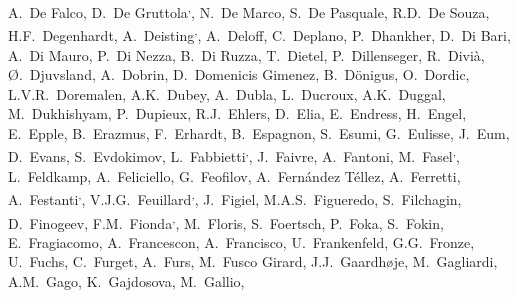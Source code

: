 \begin{flushleft}
A.~De Falco\And, 
D.~De Gruttola\textsuperscript{,}\And, 
N.~De Marco\And, 
S.~De Pasquale\And, 
R.D.~De Souza\And, 
H.F.~Degenhardt\And, 
A.~Deisting\textsuperscript{,}\And, 
A.~Deloff\And, 
C.~Deplano\And, 
P.~Dhankher\And, 
D.~Di Bari\And, 
A.~Di Mauro\And, 
P.~Di Nezza\And, 
B.~Di Ruzza\And, 
T.~Dietel\And, 
P.~Dillenseger\And, 
R.~Divi\`{a}\And, 
{\O}.~Djuvsland\And, 
A.~Dobrin\And, 
D.~Domenicis Gimenez\And, 
B.~D\"{o}nigus\And, 
O.~Dordic\And, 
L.V.R.~Doremalen\And, 
A.K.~Dubey\And, 
A.~Dubla\And, 
L.~Ducroux\And, 
A.K.~Duggal\And, 
M.~Dukhishyam\And, 
P.~Dupieux\And, 
R.J.~Ehlers\And, 
D.~Elia\And, 
E.~Endress\And, 
H.~Engel\And, 
E.~Epple\And, 
B.~Erazmus\And, 
F.~Erhardt\And, 
B.~Espagnon\And, 
S.~Esumi\And, 
G.~Eulisse\And, 
J.~Eum\And, 
D.~Evans\And, 
S.~Evdokimov\And, 
L.~Fabbietti\textsuperscript{,}\And, 
J.~Faivre\And, 
A.~Fantoni\And, 
M.~Fasel\textsuperscript{,}\And, 
L.~Feldkamp\And, 
A.~Feliciello\And, 
G.~Feofilov\And, 
A.~Fern\'{a}ndez T\'{e}llez\And, 
A.~Ferretti\And, 
A.~Festanti\textsuperscript{,}\And, 
V.J.G.~Feuillard\textsuperscript{,}\And, 
J.~Figiel\And, 
M.A.S.~Figueredo\And, 
S.~Filchagin\And, 
D.~Finogeev\And, 
F.M.~Fionda\textsuperscript{,}\And, 
M.~Floris\And, 
S.~Foertsch\And, 
P.~Foka\And, 
S.~Fokin\And, 
E.~Fragiacomo\And, 
A.~Francescon\And, 
A.~Francisco\And, 
U.~Frankenfeld\And, 
G.G.~Fronze\And, 
U.~Fuchs\And, 
C.~Furget\And, 
A.~Furs\And, 
M.~Fusco Girard\And, 
J.J.~Gaardh{\o}je\And, 
M.~Gagliardi\And, 
A.M.~Gago\And, 
K.~Gajdosova\And, 
M.~Gallio\And, 

\end{flushleft}
